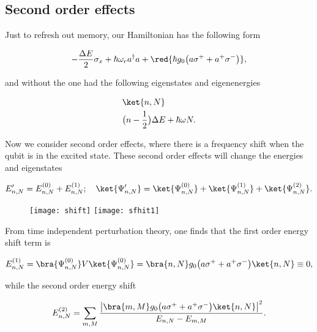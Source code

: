\subsection{Second order effects}
Just to refresh out memory, our Hamiltonian has the following form

\begin{equation}\label{sec}
  -\frac{\Delta E}{2}\sigma_x + \hbar\omega_ra^{\dagger}a + \red{\hbar g_0\big(a\sigma^{+}+a^{+}\sigma^{-}\big)},
\end{equation}

\noindent  and  without   the    one   had  the  following
eigenstates and eigenenergies

\begin{equation}\label{secStates}
  \begin{aligned}
    &\ket{n,N}\\
    &\big(n-\frac{1}{2}\big)\Delta E + \hbar\omega N.
  \end{aligned}
\end{equation}

\noindent Now we consider second order  effects, where there is a frequency shift
when the qubit is  in the excited state.  These second  order effects will change
the energies and eigenstates

\begin{equation}\label{secEi}
  E'_{n,N} = E_{n,N}^{(0)} + E_{n,N}^{(1)};\quad \ket{\Psi'_{n,N}}=\ket{\Psi^{(0)}_{n,N}}+\ket{\Psi^{(1)}_{n,N}}+\ket{\Psi^{(2)}_{n,N}}.
\end{equation}


\begin{figure}[h]
  \centering%
  \texttt{[image: shift]} \texttt{[image: sfhit1]}
\end{figure}

\noindent From  time independent  perturbation theory, one  finds that  the first
order energy shift term is

\begin{equation}\label{sec1st}
  E_{n,N}^{(1)} = \bra{\Psi^{(0)}_{n,N}}V\ket{\Psi^{(0)}_{n,N}} = \bra{n,N}g_0\big(a\sigma^{+}+a^{+}\sigma^{-}\big)\ket{n,N} \equiv 0,
\end{equation}

\noindent while the second order energy shift

\begin{equation}\label{sec2nd}
  E_{n,N}^{(2)} = \sum_{m,M}\frac{\left|\bra{m,M}g_0\big(a\sigma^{+}+a^{+}\sigma^{-}\big)\ket{n,N}\right|^2}{E_{n,N}-E_{m,M}}.
\end{equation}

